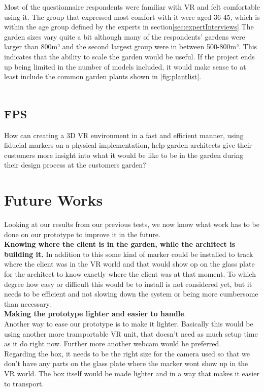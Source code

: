 Most of the questionnaire respondents were familiar with VR and felt comfortable using it. The group that expressed most comfort with it were aged 36-45, which is within the age group defined by the experts in section\autoref{sec:expertInterviews}
The garden sizes vary quite a bit although many of the respondents' gardens were larger than 800m² and the second largest group were in between 500-800m². This indicates that the ability to scale the garden would be useful. If the project ends up being limited in the number of models included, it would make sense to at least include the common garden plants shown in \autoref{fig:plantlist}.\\\\
\section*{FPS}
How can creating a 3D VR environment in a fast and efficient manner, using fiducial markers on a physical implementation, help garden architects give their customers more insight into what it would be like to be in the garden during their design process at the customers garden?


\chapter{Future Works}
Looking at our results from our previous tests, we now know what work has to be done on our prototype to improve it in the future.\\

\textbf{Knowing where the client is in the garden, while the architect is building it.} In addition to this some kind of marker could be installed to track where the client was in the VR world and that would show op on the glass plate for the architect to know exactly where the client was at that moment. To which degree how easy or difficult this would be to install is not considered yet, but it needs to be efficient and not slowing down the system or being more cumbersome than necessary.\\

\textbf{Making the prototype lighter and easier to handle}.\\
Another way to ease our prototype is to make it lighter. Basically this would be using another more transportable VR unit, that doesn't need as much setup time as it do right now. Further more another webcam would be preferred.\\
Regarding the box, it needs to be the right size for the camera used so that we don't have any parts on the glass plate where the marker wont show up in the VR world. The box itself would be made lighter and in a way that makes it easier to transport.\\

